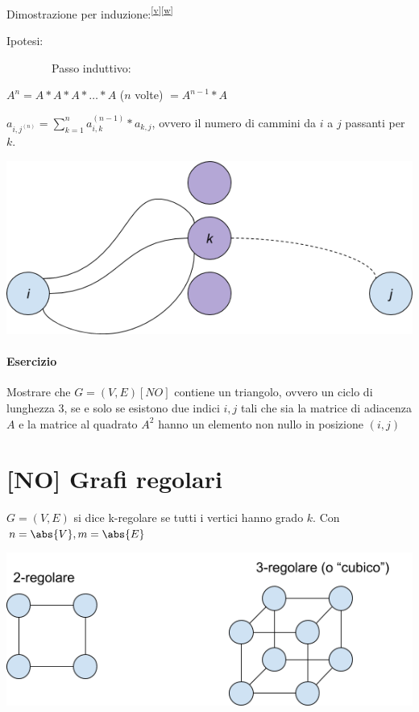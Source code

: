 {{{Dimostrazione per induzione:}\textsuperscript{\protect\hyperlink{cmnt22}{{[}v{]}}\protect\hyperlink{cmnt23}{{[}w{]}}}

{Ipotesi:}

{~~~~~~~~Passo induttivo:}

$A^n = A *A* A * \ldots * A$ ($n$ volte) $=A^{n-1}*A$

{$a_{i,j^{(n)}} = \sum_{k=1}^n{a^{(n-1)}_{i,k}*a_{k,j}}$, ovvero il numero di cammini da $i$ a $j$ passanti per $k$.}

{\includegraphics{images/image538.png}}

\paragraph{Esercizio}

{Mostrare che $G=(V,E) [NO]$ contiene un triangolo, ovvero un ciclo di lunghezza 3, se e solo se esistono due indici $i,j$ tali che sia la matrice di adiacenza $A$ e la matrice al quadrato $A^2$ hanno un elemento non nullo in posizione $(i,j)$}

\section{{[}NO{]} Grafi regolari}

{$G=(V,E)$ si dice k-regolare se tutti i vertici hanno grado $k$. Con $n=\abs{V},m=\abs{E}$}

{\includegraphics{images/image524.png}}

}}
